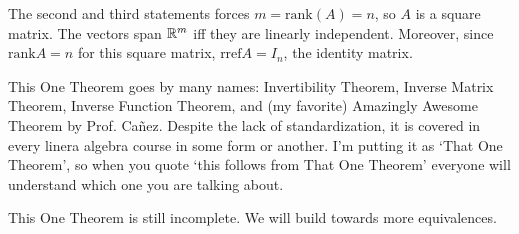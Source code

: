 The second and third statements forces $m=\textrm{rank}(A)=n$, so $A$ is a square matrix. The vectors span $\mathbb{R}^m$ iff they are linearly independent. Moreover, since $\textrm{rank}A=n$ for this square matrix, $\textrm{rref}A = I_n$, the identity matrix.
\begin{remark}
	This One Theorem goes by many names: Invertibility Theorem, Inverse Matrix Theorem, Inverse Function Theorem, and (my favorite) Amazingly Awesome Theorem by Prof. Ca\~nez.
	Despite the lack of standardization, it is covered in every linera algebra course in some form or another.
	I'm putting it as `That One Theorem', so when you quote `this follows from That One Theorem' everyone will understand which one you are talking about. 
\end{remark}
\begin{remark}
	This One Theorem is still incomplete. We will build towards more equivalences.
\end{remark}
\exercises
